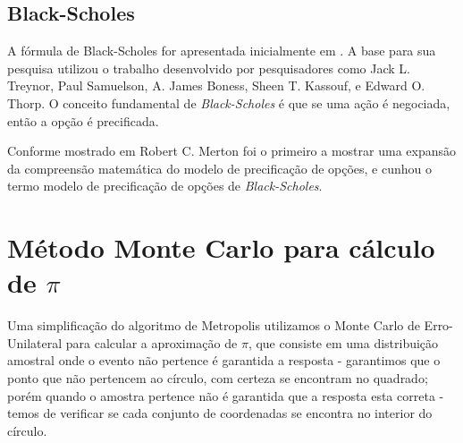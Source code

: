\documentclass[11pt,twoside]{article}
\begin{document}
    
    \subsection{Black-Scholes}
    
        A fórmula de Black-Scholes for apresentada inicialmente em \cite{BS}. A base para sua
        pesquisa utilizou o trabalho desenvolvido por pesquisadores como Jack L. Treynor, Paul
        Samuelson, A. James Boness, Sheen T. Kassouf, e Edward O. Thorp. O conceito fundamental
        de {\it Black-Scholes} é que se uma ação é negociada, então a opção é precificada.
            
        Conforme mostrado em \cite{M} Robert C. Merton foi o primeiro a mostrar uma expansão da
        compreensão matemática do modelo de precificação de opções, e cunhou o termo modelo de
        precificação de opções de {\it Black-Scholes}.

\section{Método Monte Carlo para cálculo de $\pi$}

    Uma simplificação do algoritmo de Metropolis utilizamos o Monte Carlo de Erro-Unilateral
    para calcular a aproximação de $\pi$, que consiste em uma distribuição amostral onde o 
    evento não pertence é garantida a resposta - garantimos que o ponto que não pertencem ao
    círculo, com certeza se encontram no quadrado; porém quando o amostra pertence não é 
    garantida que a resposta esta correta - temos de verificar se cada conjunto de coordenadas
    se encontra no interior do círculo.
\end{document}
